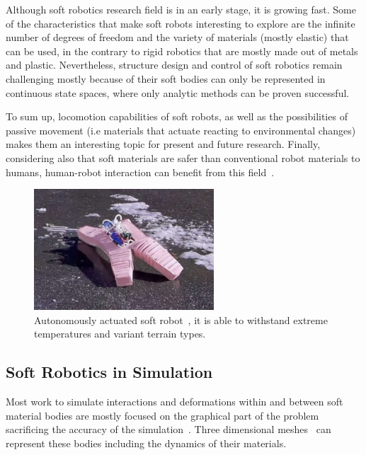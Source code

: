 Although soft robotics research field is in an early stage, it is growing fast. Some of the characteristics that make soft robots interesting to explore are the infinite number of degrees of freedom and the variety of materials (mostly elastic) that can be used, in the contrary to rigid robotics that are mostly made out of metals and plastic. Nevertheless, structure design and control of soft robotics remain challenging mostly because of their soft bodies can only be represented in continuous state spaces, where only analytic methods can be proven successful.

To sum up, locomotion capabilities of soft robots, as well as the possibilities of passive movement (i.e materials that actuate reacting to environmental changes) makes them an interesting topic for present and future research. Finally, considering also that soft materials are safer than conventional robot materials to humans, human-robot interaction can benefit from this field~\citep{sanan2011continuum}.


\begin{figure}[t!]
\centering
\includegraphics[width=0.6\textwidth]{../Figures/Misc/softbot.jpg}
\caption{Autonomously actuated soft robot~\citep{tolleyresilient}, it is able to withstand extreme temperatures and variant terrain types.}
\label{fig:softbot}
\end{figure}


\subsection{Soft Robotics in Simulation}

Most work to simulate interactions and deformations within and between soft material bodies are mostly focused on the graphical part of the problem~\citep{faloutsos1997dynamic} sacrificing the accuracy of the simulation~\citep{teschner2004versatile}. Three dimensional meshes~\citep{muller2002stable} can represent these bodies including the dynamics of their materials. 

